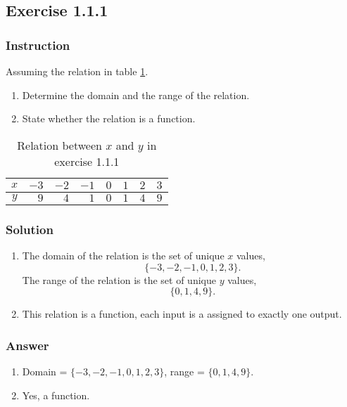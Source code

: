 \documentclass[11pt, letterpaper, oneside]{memoir}
\begin{document}
\subsection*{Exercise 1.1.1}

\subsubsection{Instruction}

Assuming the relation in table \ref{table:exercise-1.1.1}.
\begin{enumerate}[label=(\alph*)]
  \item Determine the domain and the range of the relation.
  \item State whether the relation is a function.
\end{enumerate}

\begin{table}[ht]
  \centering
  \begin{tabular}{ c | r r r r r r r }
    \hline
    $ x $ & $ -3 $ & $ -2 $ & $ -1 $ & $ 0 $ & $ 1 $ & $ 2 $ & $ 3 $ \\
    \hline
    $ y $ & $ 9 $ & $ 4 $ & $ 1 $ & $ 0 $ & $ 1 $ & $ 4 $ & $ 9 $ \\
    \hline
  \end{tabular}
  \caption{Relation between $ x $ and $ y $ in exercise 1.1.1}
  \label{table:exercise-1.1.1}
\end{table}

\subsubsection{Solution}

\begin{enumerate}[label=(\alph*)]
  \item The domain of the relation is the set of unique $ x $ values,
    $$ \phantom{.}
    \{ -3, -2, -1, 0, 1, 2, 3 \}
    .$$
    The range of the relation is the set of unique $ y $ values,
    $$ \phantom{.}
    \{ 0, 1, 4, 9 \}
    .$$
  \item This relation is a function, each input is a assigned to exactly one output.
\end{enumerate}

\subsubsection{Answer}

\begin{enumerate}[label=(\alph*)]
  \item Domain = $ \{ -3, -2, -1, 0, 1, 2, 3 \} $, range = $ \{ 0, 1, 4, 9 \} $.
  \item Yes, a function.
\end{enumerate}
\end{document}
